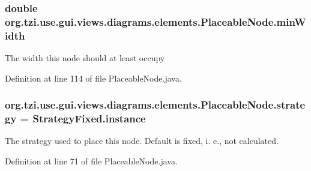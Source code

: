 \hypertarget{classorg_1_1tzi_1_1use_1_1gui_1_1views_1_1diagrams_1_1elements_1_1_placeable_node_ab1784ddd1aedb47ed56dab7205a644e2}{
\subsubsection[{min\-Width}]{\setlength{\rightskip}{0pt plus 5cm}double org.\-tzi.\-use.\-gui.\-views.\-diagrams.\-elements.\-Placeable\-Node.\-min\-Width\hspace{0.3cm}{\ttfamily [protected]}}}\label{classorg_1_1tzi_1_1use_1_1gui_1_1views_1_1diagrams_1_1elements_1_1_placeable_node_ab1784ddd1aedb47ed56dab7205a644e2}
The width this node should at least occupy 

Definition at line 114 of file Placeable\-Node.\-java.

\hypertarget{classorg_1_1tzi_1_1use_1_1gui_1_1views_1_1diagrams_1_1elements_1_1_placeable_node_af7e97f25b5b99dd5519dccf359892b26}{
\subsubsection[{strategy}]{ org.\-tzi.\-use.\-gui.\-views.\-diagrams.\-elements.\-Placeable\-Node.\-strategy = {\bf Strategy\-Fixed.\-instance}\hspace{0.3cm}{\ttfamily [protected]}}}\label{classorg_1_1tzi_1_1use_1_1gui_1_1views_1_1diagrams_1_1elements_1_1_placeable_node_af7e97f25b5b99dd5519dccf359892b26}
The strategy used to place this node. Default is fixed, i. e., not calculated. 

Definition at line 71 of file Placeable\-Node.\-java.

